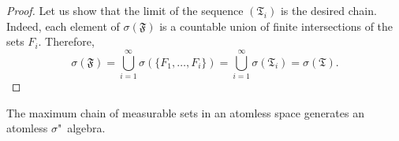 \begin{proof}
	Let us show that the limit of the sequence $(\mathfrak{T}_i)$ is the desired chain. Indeed, each element of $\sigma(\mathfrak{F})$ is a countable union of finite intersections of the sets $F_i$. Therefore, %
	\begin{equation*}
		\sigma(\mathfrak{F}) = \bigcup_{i=1}^{\infty} \sigma(\{F_1, \ldots, F_i\}) = \bigcup_{i=1}^{\infty} \sigma(\mathfrak{T}_i) = \sigma(\mathfrak{T}).
	\end{equation*}
\end{proof}

\begin{lemma} \label{lemma:max}
	The maximum chain of measurable sets in an atomless space generates an atomless $\sigma$"~algebra. %
\end{lemma}

